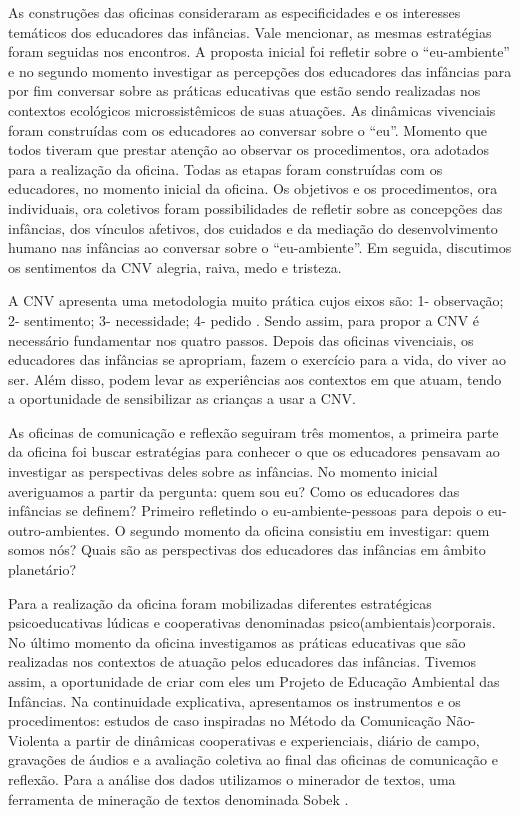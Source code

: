 \documentclass{textolivre-html}
\begin{document}
As construções das oficinas consideraram as especificidades e os interesses temáticos dos educadores das infâncias. Vale mencionar, as mesmas estratégias foram seguidas nos encontros. A proposta inicial foi refletir sobre o “eu-ambiente” e no segundo momento investigar as percepções dos educadores das infâncias para por fim conversar sobre as práticas educativas que estão sendo realizadas nos contextos ecológicos microssistêmicos de suas atuações. As dinâmicas vivenciais foram construídas com os educadores ao conversar sobre o “eu”. Momento que todos tiveram que prestar atenção ao observar os procedimentos, ora adotados para a realização da oficina. Todas as etapas foram construídas com os educadores, no momento inicial da oficina. Os objetivos e os procedimentos, ora individuais, ora coletivos foram possibilidades de refletir sobre as concepções das infâncias, dos vínculos afetivos, dos cuidados e da mediação do desenvolvimento humano nas infâncias ao conversar sobre o “eu-ambiente”. Em seguida, discutimos os sentimentos da CNV alegria, raiva, medo e tristeza. 

A CNV apresenta uma metodologia muito prática cujos eixos são: 1- observação; 2- sentimento; 3- necessidade; 4- pedido \cite{rosenberg2006}. Sendo assim, para propor a CNV é necessário fundamentar nos quatro passos. Depois das oficinas vivenciais, os educadores das infâncias se apropriam, fazem o exercício para a vida, do viver ao ser. Além disso, podem levar as experiências aos contextos em que atuam, tendo a oportunidade de sensibilizar as crianças a usar a CNV. 

As oficinas de comunicação e reflexão seguiram três momentos, a primeira parte da oficina foi buscar estratégias para conhecer o que os educadores pensavam ao investigar as perspectivas deles sobre as infâncias. No momento inicial averiguamos a partir da pergunta: quem sou eu? Como os educadores das infâncias se definem?  Primeiro refletindo o eu-ambiente-pessoas para depois o eu-outro-ambientes. O segundo momento da oficina consistiu em investigar: quem somos nós? Quais são as perspectivas dos educadores das infâncias em âmbito planetário? 

Para a realização da oficina foram mobilizadas diferentes estratégicas psicoeducativas lúdicas e cooperativas denominadas psico(ambientais)corporais. No último momento da oficina investigamos as práticas educativas que são realizadas nos contextos de atuação pelos educadores das infâncias. Tivemos assim, a oportunidade de criar com eles um Projeto de Educação Ambiental das Infâncias. Na continuidade explicativa, apresentamos os instrumentos e os procedimentos: estudos de caso inspiradas no Método da Comunicação Não-Violenta \cite{rosenberg2006} a partir de dinâmicas cooperativas e experienciais, diário de campo, gravações de áudios e a avaliação coletiva ao final das oficinas de comunicação e reflexão. Para a análise dos dados utilizamos o minerador de textos, uma ferramenta de mineração de textos denominada Sobek \cite{epstein2017}.
\end{document}
